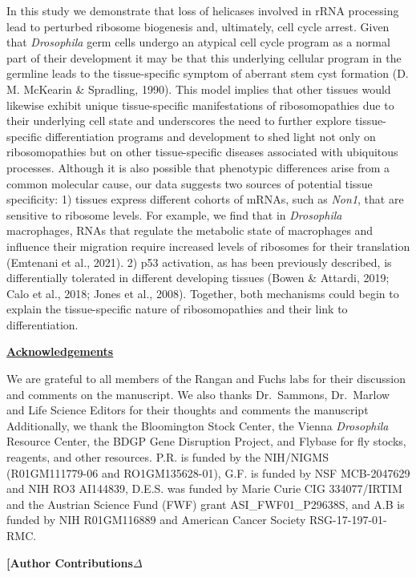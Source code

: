 \documentclass[12pt,oneside]{reedthesis}
\begin{document}
In this study we demonstrate that loss of helicases involved in rRNA
processing lead to perturbed ribosome biogenesis and, ultimately, cell
cycle arrest. Given that \emph{Drosophila} germ cells undergo an atypical
cell cycle program as a normal part of their development it may be that
this underlying cellular program in the germline leads to the
tissue-specific symptom of aberrant stem cyst formation
(D. M. McKearin \& Spradling, 1990). This model implies that other tissues would
likewise exhibit unique tissue-specific manifestations of
ribosomopathies due to their underlying cell state and underscores the
need to further explore tissue-specific differentiation programs and
development to shed light not only on ribosomopathies but on other
tissue-specific diseases associated with ubiquitous processes. Although
it is also possible that phenotypic differences arise from a common
molecular cause, our data suggests two sources of potential tissue
specificity: 1) tissues express different cohorts of mRNAs, such as
\emph{Non1}, that are sensitive to ribosome levels. For example, we find that
in \emph{Drosophila} macrophages, RNAs that regulate the metabolic state of
macrophages and influence their migration require increased levels of
ribosomes for their translation (Emtenani et al., 2021).
2) p53 activation, as has been previously described, is differentially
tolerated in different developing tissues
(Bowen \& Attardi, 2019; Calo et al., 2018; Jones et al., 2008). Together, both
mechanisms could begin to explain the tissue-specific nature of
ribosomopathies and their link to differentiation.

\textbf{\underline{Acknowledgements}}

We are grateful to all members of the Rangan and Fuchs labs for their
discussion and comments on the manuscript. We also thanks Dr.~Sammons,
Dr.~Marlow and Life Science Editors for their thoughts and comments the
manuscript Additionally, we thank the Bloomington Stock Center, the
Vienna \emph{Drosophila} Resource Center, the BDGP Gene Disruption Project,
and Flybase for fly stocks, reagents, and other resources. P.R. is
funded by the NIH/NIGMS (R01GM111779-06 and RO1GM135628-01), G.F. is
funded by NSF MCB-2047629 and NIH RO3 AI144839, D.E.S. was funded by
Marie Curie CIG 334077/IRTIM and the Austrian Science Fund (FWF) grant
ASI\_FWF01\_P29638S, and A.B is funded by NIH R01GM116889 and American
Cancer Society RSG-17-197-01-RMC.

\textbf{{[}Author Contributions\(\Delta\)}
\end{document}
